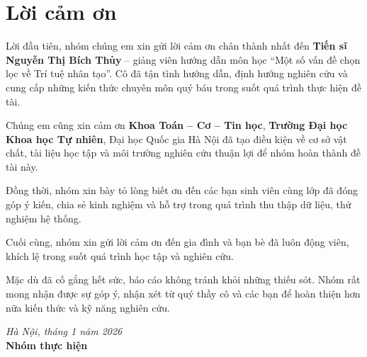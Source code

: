﻿\chapter*{Lời cảm ơn}

Lời đầu tiên, nhóm chúng em xin gửi lời cảm ơn chân thành nhất đến \textbf{Tiến sĩ Nguyễn Thị Bích Thủy} -- giảng viên hướng dẫn môn học ``Một số vấn đề chọn lọc về Trí tuệ nhân tạo''. Cô đã tận tình hướng dẫn, định hướng nghiên cứu và cung cấp những kiến thức chuyên môn quý báu trong suốt quá trình thực hiện đề tài.

Chúng em cũng xin cảm ơn \textbf{Khoa Toán -- Cơ -- Tin học}, \textbf{Trường Đại học Khoa học Tự nhiên}, Đại học Quốc gia Hà Nội đã tạo điều kiện về cơ sở vật chất, tài liệu học tập và môi trường nghiên cứu thuận lợi để nhóm hoàn thành đề tài này.

Đồng thời, nhóm xin bày tỏ lòng biết ơn đến các bạn sinh viên cùng lớp đã đóng góp ý kiến, chia sẻ kinh nghiệm và hỗ trợ trong quá trình thu thập dữ liệu, thử nghiệm hệ thống.

Cuối cùng, nhóm xin gửi lời cảm ơn đến gia đình và bạn bè đã luôn động viên, khích lệ trong suốt quá trình học tập và nghiên cứu.

Mặc dù đã cố gắng hết sức, báo cáo không tránh khỏi những thiếu sót. Nhóm rất mong nhận được sự góp ý, nhận xét từ quý thầy cô và các bạn để hoàn thiện hơn nữa kiến thức và kỹ năng nghiên cứu.

\vspace{1cm}
\begin{flushright}
\textit{Hà Nội, tháng 1 năm 2026}\\
\textbf{Nhóm thực hiện}
\end{flushright}
